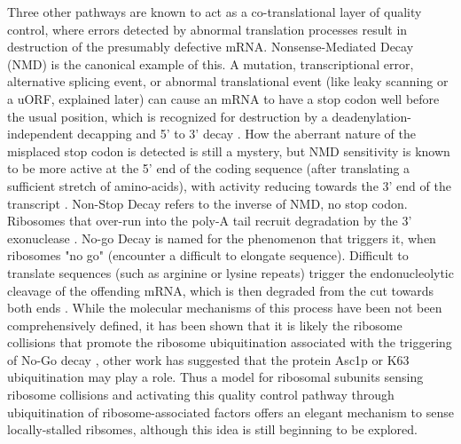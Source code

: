 Three other pathways are known to act as a
co-translational layer of quality control, where errors detected by
abnormal translation processes result in destruction of the presumably
defective mRNA. Nonsense-Mediated Decay (NMD) is the canonical example
of this. A mutation, transcriptional error, alternative splicing
event, or abnormal translational event (like leaky scanning or a uORF,
explained later) can cause an mRNA to have a stop codon well before
the usual position, which is recognized for destruction by a
deadenylation-independent decapping and 5' to 3' decay 
\parencite{muhlrad1994premature}. 
How the aberrant nature of the misplaced stop codon is
detected is still a mystery, but NMD sensitivity is known to be
more active at the 5' end of the coding sequence (after translating
a sufficient stretch of amino-acids), with activity reducing
towards the 3' end of the transcript
\parencite{losson1979interference}. 
Non-Stop Decay refers to the inverse of
NMD, no stop codon. Ribosomes that over-run into the poly-A tail
recruit degradation by the 3' exonuclease 
\parencite{schmid2008exosome}. No-go Decay is
named for the phenomenon that triggers it, when ribosomes "no go"
(encounter a difficult to elongate sequence).
Difficult to translate sequences (such as arginine or lysine repeats) 
trigger the
endonucleolytic cleavage of the offending mRNA, which is then degraded
from the cut towards both ends 
\parencite{doma2006endonucleolytic}. While the molecular mechanisms of
this process have been not been comprehensively defined, 
it has been shown that it is likely the ribosome collisions that
promote the ribosome ubiquitination associated with the triggering of
No-Go decay \parencite{simms2017ribosome}, 
other work has suggested that the
protein Asc1p \parencite{ikeuchi2016ribosome} 
or K63 ubiquitination \parencite{saito2015inhibiting}
may play a role.
Thus a model for ribosomal subunits sensing ribosome collisions 
and activating this quality control pathway through ubiquitination
of ribosome-associated factors offers an elegant mechanism to sense
locally-stalled ribsomes, although this idea is still beginning to be
explored.


